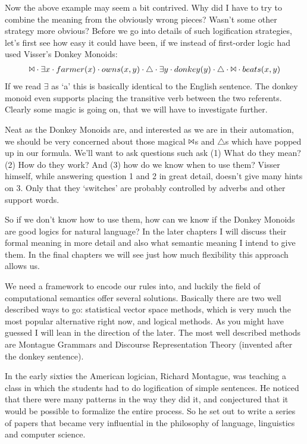 \documentclass[12pt]{article}
\begin{document}
Now the above example may seem a bit contrived. Why did I have to try to combine the meaning from the obviously wrong pieces? Wasn't some other strategy more obvious? Before we go into details of such logification strategies, let's first see how easy it could have been, if we instead of first-order logic had used Visser's Donkey Monoids:
%
\begin{align}
\Bowtie \cdot \exists x \cdot farmer(x) \cdot owns(x,y) \cdot\triangle\cdot\exists y \cdot donkey(y) \cdot\triangle\cdot\Bowtie\cdot beats(x,y)
\end{align}
%
If we read $\exists$ as `a' this is basically identical to the English sentence. The donkey monoid even supports placing the transitive verb between the two referents. Clearly some magic is going on, that we will have to investigate further.

Neat as the Donkey Monoids are, and interested as we are in their automation, we should be very concerned about those magical $\Bowtie$s and $\triangle$s which have popped up in our formula. We'll want to ask questions such ask (1) What do they mean? (2) How do they work? And (3) how do we know when to use them? Visser himself, while answering question 1 and 2 in great detail, doesn't give many hints on 3. Only that they `switches' are probably controlled by adverbs and other support words.

So if we don't know how to use them, how can we know if the Donkey Monoids are good logics for natural language? In the later chapters I will discuss their formal meaning in more detail and also what semantic meaning I intend to give them. In the final chapters we will see just how much flexibility this approach allows us.

We need a framework to encode our rules into, and luckily the field of computational semantics offer several solutions. Basically there are two well described ways to go: statistical vector space methods, which is very much the most popular alternative right now, and logical methods. As you might have guessed I will lean in the direction of the later. The most well described methods are Montague Grammars and Discourse Representation Theory (invented after the donkey sentence).

In the early sixties the American logician, Richard Montague, was teaching a class in which the students had to do logification of simple sentences. He noticed that there were many patterns in the way they did it, and conjectured that it would be possible to formalize the entire process. So he set out to write a series of papers that became very influential in the philosophy of language, linguistics and computer science.
\end{document}
